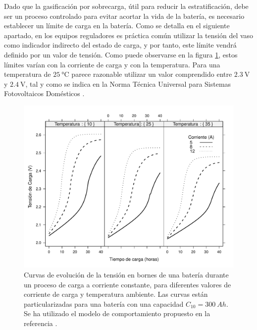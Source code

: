 Dado que la gasificación por sobrecarga, útil para reducir la estratificación,
debe ser un proceso controlado para evitar acortar la vida de la batería,
es necesario establecer un límite de carga en la batería. Como se
detalla en el siguiente apartado, en los equipos reguladores es práctica
común utilizar la tensión del vaso como indicador indirecto del estado
de carga, y por tanto, este límite vendrá definido por un valor de
tensión. Como puede observarse en la figura \ref{fig:CurvasCarga},
estos límites varían con la corriente de carga y con la temperatura.
Para una temperatura de $\SI{25}{\celsius}$ parece razonable utilizar
un valor comprendido entre $\SI{2.3}{\volt}$ y $\SI{2.4}{\volt}$,
tal y como se indica en la Norma Técnica Universal para Sistemas Fotovoltaicos
Domésticos \citep{Egido.Lorenzo1998}.

%
\begin{figure}
\begin{centering}
\includegraphics[scale=0.75]{../figs/Bateria_CorrYTemp}
\end{centering}

\caption[Curvas de evolución de la tensión en bornes de una batería durante
un proceso de carga a corriente constante]{Curvas de evolución de la tensión en bornes de una batería durante
un proceso de carga a corriente constante, para diferentes valores
de corriente de carga y temperatura ambiente. Las curvas están particularizadas
para una batería con una capacidad $C_{10}=\SI{300}{Ah}$. Se ha utilizado
el modelo de comportamiento propuesto en la referencia \citep{Copetti.Lorenzo.ea1993}.\label{fig:CurvasCarga}}

\end{figure}


